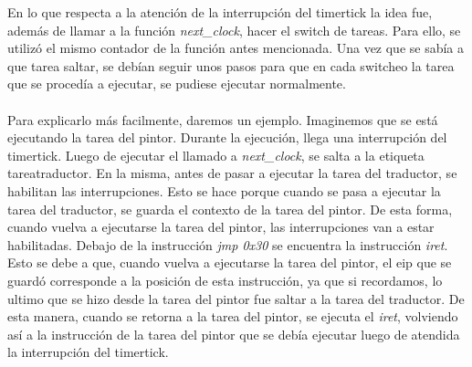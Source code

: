 En lo que respecta a la atenci\'on de la interrupci\'on del timertick la idea fue, adem\'as de llamar a la funci\'on \textit{next\_clock}, hacer el switch de tareas. Para ello, se utiliz\'o el mismo contador de la funci\'on antes mencionada. Una vez que se sab\'ia a que tarea saltar, se deb\'ian seguir unos pasos para que en cada switcheo la tarea que se proced\'ia a ejecutar, se pudiese ejecutar normalmente.
\paragraph{}
Para explicarlo m\'as facilmente, daremos un ejemplo. Imaginemos que se est\'a ejecutando la tarea del pintor. Durante la ejecuci\'on, llega una interrupci\'on del timertick. Luego de ejecutar el llamado a \textit{next\_clock}, se salta a la etiqueta tareatraductor. En la misma, antes de pasar a ejecutar la tarea del traductor, se habilitan las interrupciones. Esto se hace porque cuando se pasa a ejecutar la tarea del traductor, se guarda el contexto de la tarea del pintor. De esta forma, cuando vuelva a ejecutarse la tarea del pintor, las interrupciones van a estar habilitadas. Debajo de la instrucci\'on \textit{jmp 0x30} se encuentra la instrucci\'on \textit{iret}. Esto se debe a que, cuando vuelva a ejecutarse la tarea del pintor, el eip que se guard\'o corresponde a la posici\'on de esta instrucci\'on, ya que si recordamos, lo ultimo que se hizo desde la tarea del pintor fue saltar a la tarea del traductor. De esta manera, cuando se retorna a la tarea del pintor, se ejecuta el \textit{iret}, volviendo as\'i a la instrucci\'on de la tarea del pintor que se deb\'ia ejecutar luego de atendida la interrupci\'on del timertick.

